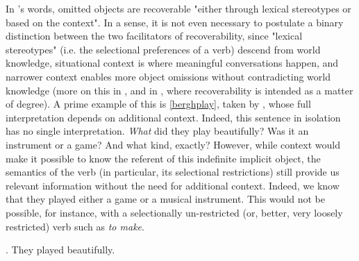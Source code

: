 In \textcite[7]{Kardos2010}'s words, omitted objects are recoverable "either through lexical stereotypes or based on the context". In a sense, it is not even necessary to postulate a binary distinction between the two facilitators of recoverability, since "lexical stereotypes" (i.e. the selectional preferences of a verb) descend from world knowledge, situational context is where meaningful conversations happen, and narrower context enables more object omissions without contradicting world knowledge (more on this in , and in \textcite{Glass2013, Glass2020, glass2022english}, where recoverability is intended as a matter of degree). A prime example of this is \ref{berghplay}, taken by \textcite[24]{BerghOhlander2016}, whose full interpretation depends on additional context. Indeed, this sentence in isolation has no single interpretation. \textit{What} did they play beautifully? Was it an instrument or a game? And what kind, exactly? However, while context would make it possible to know the referent of this indefinite implicit object, the semantics of the verb (in particular, its selectional restrictions) still provide us relevant information without the need for additional context. Indeed, we know that they played either a game or a musical instrument. This would not be possible, for instance, with a selectionally un-restricted (or, better, very loosely restricted) verb such as \textit{to make}.

\ex. \label{berghplay} They played beautifully.

